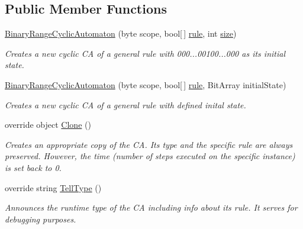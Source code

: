 \subsection*{Public Member Functions}
\begin{DoxyCompactItemize}
\item 
\hyperlink{class_cellular_1_1_binary_range_cyclic_automaton_a9f47b4027eba7db4a959946967ba371e}{Binary\+Range\+Cyclic\+Automaton} (byte scope, bool\mbox{[}$\,$\mbox{]} \hyperlink{class_cellular_1_1_binary_range_automaton_a4dda99c3151599c8ef12d08d7472144c}{rule}, int \hyperlink{class_cellular_1_1_automaton1_d_a915129ccf0f1e7092844c99ce6a28e5b}{size})
\begin{DoxyCompactList}\small\item\em Creates a new cyclic C\+A of a general rule with 000...00100...000 as its initial state. \end{DoxyCompactList}\item 
\hyperlink{class_cellular_1_1_binary_range_cyclic_automaton_a541a8c6eff23ec8afddc7388158df80e}{Binary\+Range\+Cyclic\+Automaton} (byte scope, bool\mbox{[}$\,$\mbox{]} \hyperlink{class_cellular_1_1_binary_range_automaton_a4dda99c3151599c8ef12d08d7472144c}{rule}, Bit\+Array initial\+State)
\begin{DoxyCompactList}\small\item\em Creates a new cyclic C\+A of a general rule with defined inital state. \end{DoxyCompactList}\item 
override object \hyperlink{class_cellular_1_1_binary_range_cyclic_automaton_a2361fe82802e372b24b8bec6a6135278}{Clone} ()
\begin{DoxyCompactList}\small\item\em Creates an appropriate copy of the C\+A. Its type and the specific rule are always preserved. However, the time (number of steps executed on the specific instance) is set back to 0. \end{DoxyCompactList}\item 
override string \hyperlink{class_cellular_1_1_binary_range_cyclic_automaton_a75754d1c54550e1f29a9282647947cb8}{Tell\+Type} ()
\begin{DoxyCompactList}\small\item\em Announces the runtime type of the C\+A including info about its rule. It serves for debugging purposes. \end{DoxyCompactList}\end{DoxyCompactItemize}
